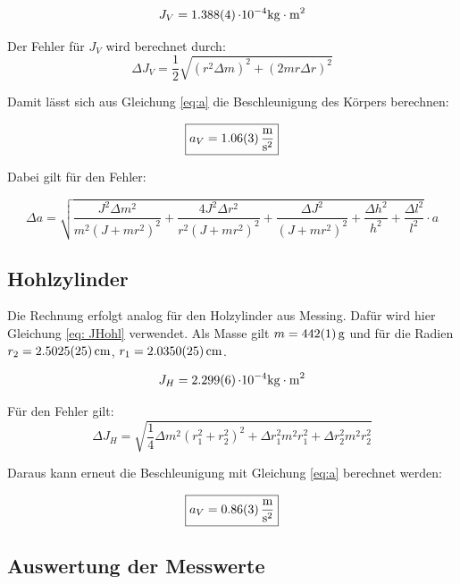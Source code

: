\[ J_V = \SI{1,388 \pm 0,004}{\cdot 10^{-4} \kilogram \cdot \meter^2} \]

Der Fehler für $J_V$ wird berechnet durch:
\begin{equation}
    \Delta J_V = \frac{1}{2}\sqrt{(r^2 \Delta m)^2 + (2mr\Delta r)^2}
\end{equation}

Damit lässt sich aus Gleichung \ref{eq:a} die Beschleunigung des Körpers berechnen:

\[\boxed{a_V = \SI{1,06 \pm 0,03}{\frac{\meter}{\second^2}}}\]

Dabei gilt für den Fehler:

\begin{equation}
    \Delta a=\sqrt{\frac{J^{2} \Delta m^{2}}{m^{2} \left(J + m r^{2}\right)^{2}} + \frac{4 J^{2} \Delta r^{2}}{r^{2} \left(J + m r^{2}\right)^{2}} + \frac{\Delta J^{2}}{\left(J + m r^{2}\right)^{2}} + \frac{\Delta h^{2}}{h^{2}} + \frac{\Delta l^{2}}{l^{2}}}\cdot a
\end{equation}

\subsection{Hohlzylinder}

Die Rechnung erfolgt analog für den Holzylinder aus Messing. Dafür wird hier Gleichung \ref{eq: JHohl} verwendet.
Als Masse gilt $m=\SI{442 \pm 1}{\gram}$ und für die Radien $r_2 = \SI{2,5025 \pm 0,0025}{\cm}$, $r_1 = \SI{2,0350\pm 0,0025}{\cm}$.

\[ J_H = \SI{2,299 \pm 0,006}{\cdot 10^{-4} \kilogram \cdot \meter^2}\]

Für den Fehler gilt:
\begin{equation}
    \Delta J_H=\sqrt{\frac{1}{4} \Delta m^{2} \left(r_{1}^{2} + r_{2}^{2}\right)^{2} + \Delta r_{1}^{2} m^{2} r_{1}^{2} + \Delta r_{2}^{2} m^{2} r_{2}^{2}}
\end{equation}

Daraus kann erneut die Beschleunigung mit Gleichung \ref{eq:a} berechnet werden:

\[\boxed{a_V =  \SI{0,86 \pm 0,03}{\frac{\meter}{\second^2}}}\]


\subsection{Auswertung der Messwerte}

